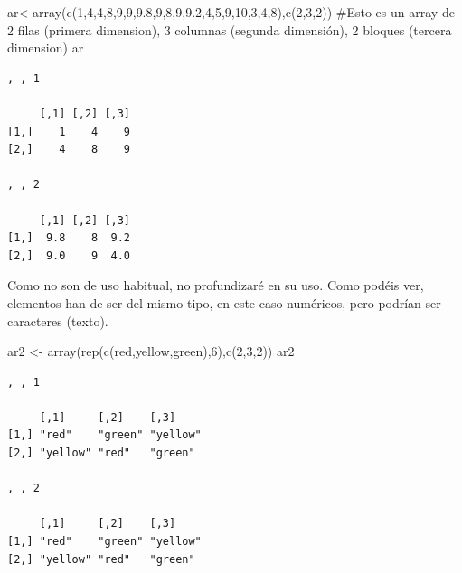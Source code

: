 \documentclass[
  letterpaper,
  DIV=11,
  numbers=noendperiod]{scrreprt}
\newenvironment{Shaded}{\begin{snugshade}}{\end{snugshade}}
\newcommand{\CommentTok}[1]{\textcolor[rgb]{0.37,0.37,0.37}{#1}}
\newcommand{\DecValTok}[1]{\textcolor[rgb]{0.68,0.00,0.00}{#1}}
\newcommand{\FloatTok}[1]{\textcolor[rgb]{0.68,0.00,0.00}{#1}}
\newcommand{\FunctionTok}[1]{\textcolor[rgb]{0.28,0.35,0.67}{#1}}
\newcommand{\NormalTok}[1]{\textcolor[rgb]{0.00,0.23,0.31}{#1}}
\newcommand{\OtherTok}[1]{\textcolor[rgb]{0.00,0.23,0.31}{#1}}
\newcommand{\StringTok}[1]{\textcolor[rgb]{0.13,0.47,0.30}{#1}}
\begin{document}
\begin{Shaded}
\begin{Highlighting}[]
\NormalTok{ar}\OtherTok{\textless{}{-}}\FunctionTok{array}\NormalTok{(}\FunctionTok{c}\NormalTok{(}\DecValTok{1}\NormalTok{,}\DecValTok{4}\NormalTok{,}\DecValTok{4}\NormalTok{,}\DecValTok{8}\NormalTok{,}\DecValTok{9}\NormalTok{,}\DecValTok{9}\NormalTok{,}\FloatTok{9.8}\NormalTok{,}\DecValTok{9}\NormalTok{,}\DecValTok{8}\NormalTok{,}\DecValTok{9}\NormalTok{,}\FloatTok{9.2}\NormalTok{,}\DecValTok{4}\NormalTok{,}\DecValTok{5}\NormalTok{,}\DecValTok{9}\NormalTok{,}\DecValTok{10}\NormalTok{,}\DecValTok{3}\NormalTok{,}\DecValTok{4}\NormalTok{,}\DecValTok{8}\NormalTok{),}\FunctionTok{c}\NormalTok{(}\DecValTok{2}\NormalTok{,}\DecValTok{3}\NormalTok{,}\DecValTok{2}\NormalTok{)) }\CommentTok{\#Esto es un array de 2 filas (primera dimension), 3 columnas (segunda dimensión), 2 bloques (tercera dimension)}
\NormalTok{ar}
\end{Highlighting}
\end{Shaded}

\begin{verbatim}
, , 1

     [,1] [,2] [,3]
[1,]    1    4    9
[2,]    4    8    9

, , 2

     [,1] [,2] [,3]
[1,]  9.8    8  9.2
[2,]  9.0    9  4.0
\end{verbatim}

Como no son de uso habitual, no profundizaré en su uso. Como podéis ver,
elementos han de ser del mismo tipo, en este caso numéricos, pero
podrían ser caracteres (texto).

\begin{Shaded}
\begin{Highlighting}[]
\NormalTok{ar2 }\OtherTok{\textless{}{-}} \FunctionTok{array}\NormalTok{(}\FunctionTok{rep}\NormalTok{(}\FunctionTok{c}\NormalTok{(}\StringTok{\textquotesingle{}red\textquotesingle{}}\NormalTok{,}\StringTok{\textquotesingle{}yellow\textquotesingle{}}\NormalTok{,}\StringTok{\textquotesingle{}green\textquotesingle{}}\NormalTok{),}\DecValTok{6}\NormalTok{),}\FunctionTok{c}\NormalTok{(}\DecValTok{2}\NormalTok{,}\DecValTok{3}\NormalTok{,}\DecValTok{2}\NormalTok{))}
\NormalTok{ar2}
\end{Highlighting}
\end{Shaded}

\begin{verbatim}
, , 1

     [,1]     [,2]    [,3]    
[1,] "red"    "green" "yellow"
[2,] "yellow" "red"   "green" 

, , 2

     [,1]     [,2]    [,3]    
[1,] "red"    "green" "yellow"
[2,] "yellow" "red"   "green" 
\end{verbatim}
\end{document}
